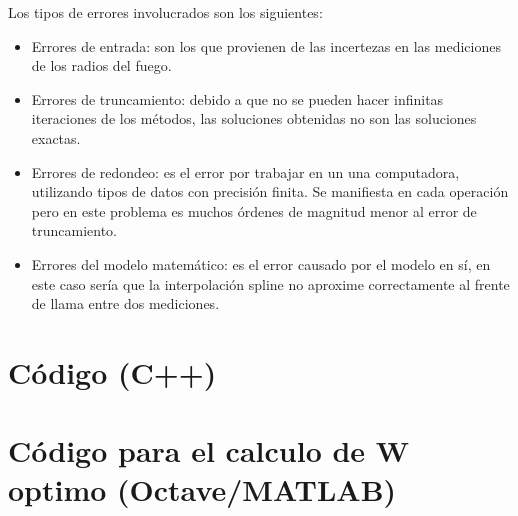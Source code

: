 \documentclass[12pt,spanish]{article}
\begin{document}
Los tipos de errores involucrados son los siguientes:
\begin{itemize}
    \item Errores de entrada: son los que provienen de las incertezas en las mediciones de los radios del fuego.
    \item Errores de truncamiento: debido a que no se pueden hacer infinitas iteraciones de los métodos, las soluciones obtenidas no son las soluciones exactas.
    \item Errores de redondeo: es el error por trabajar en un una computadora, utilizando tipos de datos con precisión finita. Se manifiesta en cada operación pero en este problema es muchos órdenes de magnitud menor al error de truncamiento.
    \item Errores del modelo matemático: es el error causado por el modelo en sí, en este caso sería que la interpolación spline no aproxime correctamente al frente de llama entre dos mediciones.
\end{itemize}

\newpage
\appendix
\section{Código (C++)}

\section{Código para el calculo de W optimo (Octave/MATLAB)}

\end{document}
